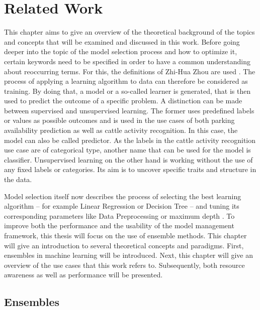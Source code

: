 \chapter{Related Work} 

This chapter aims to give an overview of the theoretical background of the topics and concepts that will be examined and discussed in this work. Before going deeper into the topic of the model selection process and how to optimize it, certain keywords need to be specified in order to have a common understanding about reoccurring terms. For this, the definitions of Zhi-Hua Zhou are used \cite{zhou2012}. The process of applying a learning algorithm to data can therefore be considered as training. By doing that, a model or a so-called learner is generated, that is then used to predict the outcome of a specific problem. A distinction can be made between supervised and unsupervised learning. The former uses predefined labels or values as possible outcomes and is used in the use cases of both parking availability prediction as well as cattle activity recognition. In this case, the model can also be called predictor. As the labels in the cattle activity recognition use case are of categorical type, another name that can be used for the model is classifier. Unsupervised learning on the other hand is working without the use of any fixed labels or categories. Its aim is to uncover specific traits and structure in the data.

Model selection itself now describes the process of selecting the best learning algorithm – for example Linear Regression or Decision Tree – and tuning its corresponding parameters like Data Preprocessing or maximum depth \cite{zhou2012}. To improve both the performance and the usability of the model management framework, this thesis will focus on the use of ensemble methods. This chapter will give an introduction to several theoretical concepts and paradigms. First, ensembles in machine learning will be introduced. Next, this chapter will give an overview of the use cases that this work refers to. Subsequently, both resource awareness as well as performance will be presented.


\section{Ensembles}


